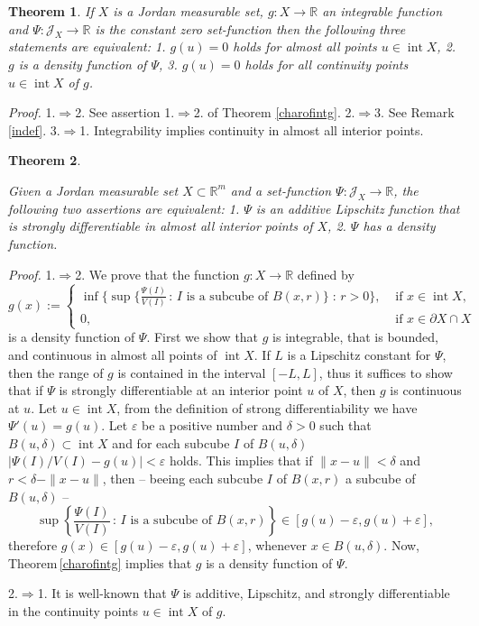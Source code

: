 \documentclass{article}
\newcommand{\proof}[1]{\textit{Proof. }#1}
\newtheorem{theorem}{Theorem}
\newcommand{\ir}{\mathop{\mathrm{int}}\nolimits}
\newcommand{\R}{\ensuremath{\mathbb R}}
\newcommand{\J}{\mathscr{J}}
\newcommand{\ee}{\varepsilon}
\newcommand{\dd}{\delta}
\newcommand{\bol}{$\Rightarrow$}
\begin{document}
\begin{theorem}\label{densofzero}
If $X$ is a Jordan measurable set, $g:X\to\R$ an integrable
function and $ \Psi\colon\J_X\to\R$ is the constant zero
set-function then the following three statements are equivalent:
1. $g(u)=0 $ holds for almost all points $u\in\ir X$, 2. $g$ is a
density function of $\Psi$, 3. $g(u)=0 $ holds for all continuity
points $u\in\ir X$ of $g$.
\end{theorem}

\proof{
1.\bol2. See assertion 1.\bol2. of Theorem \ref{charofintg}.
2.\bol3. See Remark \ref{indef}. 3.\bol1. Integrability implies
continuity in almost all interior points.
}%

\begin{theorem}\label{charofindef}

Given a Jordan measurable set $X\subset\R^m$ and a set-function
$\Psi\colon\J_X\to\R$, the following two assertions are
equivalent: 1. $\Psi$ is an additive Lipschitz function that is
strongly differentiable in almost all interior points of $X$, 2.
$\Psi$ has a density function.
\end{theorem}
\proof{ 1.\bol2. We prove that the function $g\colon X\to \R$ defined
by
\[g(x):=\left\{
   \begin{array}{rl}
 \inf\{\sup\{\frac{\Psi(I)}{V(I)}\,:\,I\mbox{ is a subcube of }B(x,r)\}\;:\,r>0\},&\mbox{ if\ }x\in\ir  X,\\
0,&\mbox{ if\ }x\in \partial X\cap X
\end{array}\right.
\]
is a density function of $\Psi$. First we show that $g$ is
integrable, that is bounded, and continuous in almost all points
of $\ir X$. If $L$ is a Lipschitz constant for $\Psi$, then the
range of $g$ is contained in the interval $[-L,L]$, thus it
suffices to show that if $\Psi$ is strongly differentiable at an
interior point $u$ of $X$, then $g$ is continuous at $u$. Let
$u\in\ir X$, from the definition of strong differentiability we
have $\Psi'(u)=g(u)$. Let $\ee$ be a positive number and $\dd>0$
such that $B(u,\dd)\subset\ir X$ and for each subcube $I$ of
$B(u,\dd)$ $|\Psi(I)/V(I)-g(u)|<\ee$ holds. This implies that if
$\|x-u\|<\dd$ and $r<\dd-\|x-u\|$, then -- beeing each subcube $I$
of $B(x,r)$ a subcube of $B(u,\dd)$ --
\[\sup\left\{\frac{\Psi(I)}{V(I)}\,:\,I\mbox{ is a subcube of }B(x,r)\right\}\in [g(u)-\ee,g(u)+\ee],\]
therefore $g(x)\in[g(u)-\ee,g(u)+\ee]$, whenever $x\in B(u,\dd)$.
Now, Theorem\,\ref{charofintg} implies that $g$ is a density
function of $\Psi$.

2.\bol1. It is well-known that $\Psi$ is additive, Lipschitz, and
strongly differentiable in the continuity points $u\in\ir X$ of
$g$.
}%
\end{document}
